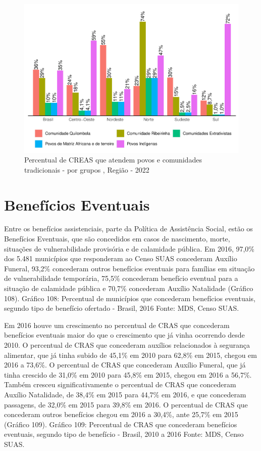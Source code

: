 \documentclass[
  brazilian]{report}
\begin{document}
\begin{figure}
\includegraphics{Censo-SUAS-2022_files/figure-latex/povos-tradicionais-1} \caption[Percentual de CREAS que atendem povos e comunidades tradicionais -  por grupos , Região - 2022]{Percentual de CREAS que atendem povos e comunidades tradicionais -  por grupos , Região - 2022}\label{fig:povos-tradicionais}
\end{figure}

\hypertarget{benefuxedcios-eventuais}{%
\section{Benefícios Eventuais}\label{benefuxedcios-eventuais}}

Entre os benefícios assistenciais, parte da Política de Assistência
Social, estão os Benefícios Eventuais, que são concedidos em casos de
nascimento, morte, situações de vulnerabilidade provisória e de
calamidade pública. Em 2016, 97,0\% dos 5.481 municípios que responderam
ao Censo SUAS concederam Auxílio Funeral, 93,2\% concederam outros
benefícios eventuais para famílias em situação de vulnerabilidade
temporária, 75,5\% concederam benefício eventual para a situação de
calamidade pública e 70,7\% concederam Auxílio Natalidade (Gráfico 108).
Gráfico 108: Percentual de municípios que concederam benefícios
eventuais, segundo tipo de benefício ofertado - Brasil, 2016 Fonte: MDS,
Censo SUAS.

Em 2016 houve um crescimento no percentual de CRAS que concederam
benefícios eventuais maior do que o crescimento que já vinha ocorrendo
desde 2010. O percentual de CRAS que concederam auxílios relacionados à
segurança alimentar, que já tinha subido de 45,1\% em 2010 para 62,8\%
em 2015, chegou em 2016 a 73,6\%. O percentual de CRAS que concederam
Auxílio Funeral, que já tinha crescido de 31,0\% em 2010 para 45,8\% em
2015, chegou em 2016 a 56,7\%. Também cresceu significativamente o
percentual de CRAS que concederam Auxílio Natalidade, de 38,4\% em 2015
para 44,7\% em 2016, e que concederam passagens, de 32,0\% em 2015 para
39,8\% em 2016. O percentual de CRAS que concederam outros benefícios
chegou em 2016 a 30,4\%, ante 25,7\% em 2015 (Gráfico 109). Gráfico 109:
Percentual de CRAS que concederam benefícios eventuais, segundo tipo de
benefício - Brasil, 2010 a 2016 Fonte: MDS, Censo SUAS.
\end{document}

